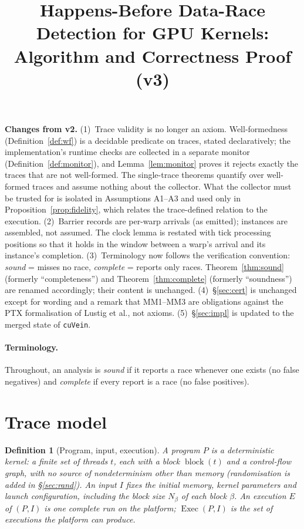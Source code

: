 \documentclass[11pt]{article}
\title{Happens-Before Data-Race Detection for GPU Kernels:\\
Algorithm and Correctness Proof (v3)}
\date{}
\newtheorem{definition}[theorem]{Definition}
\theoremstyle{remark}
\DeclareMathOperator{\blk}{block}
\DeclareMathOperator{\Exec}{Exec}
\begin{document}
\maketitle

\noindent\textbf{Changes from v2.}
(1)~Trace validity is no longer an axiom. Well-formedness
(Definition~\ref{def:wf}) is a decidable predicate on traces, stated
declaratively; the implementation's runtime checks are collected in a
separate monitor (Definition~\ref{def:monitor}), and Lemma~\ref{lem:monitor}
proves it rejects exactly the traces that are not well-formed. The single-trace theorems quantify over well-formed traces and assume
nothing about the collector. What the collector must be trusted for is
isolated in Assumptions A1--A3 and used only in
Proposition~\ref{prop:fidelity}, which relates the trace-defined relation to
the execution.
(2)~Barrier records are per-warp arrivals (as emitted); instances are
assembled, not assumed. The clock lemma is restated with tick processing
positions so that it holds in the window between a warp's arrival and its
instance's completion.
(3)~Terminology now follows the verification convention: \emph{sound} = misses
no race, \emph{complete} = reports only races. Theorem~\ref{thm:sound}
(formerly ``completeness'') and Theorem~\ref{thm:complete} (formerly
``soundness'') are renamed accordingly; their content is unchanged.
(4)~\S\ref{sec:cert} is unchanged except for wording and a remark that MM1--MM3
are obligations against the PTX formalisation of Lustig et al., not axioms.
(5)~\S\ref{sec:impl} is updated to the merged state of \texttt{cuVein}.

\paragraph{Terminology.}
Throughout, an analysis is \emph{sound} if it reports a race whenever one
exists (no false negatives) and \emph{complete} if every report is a race (no
false positives).

\section{Trace model}\label{sec:model}

\begin{definition}[Program, input, execution]
A \emph{program} $P$ is a deterministic kernel: a finite set of threads $t$,
each with a block $\blk(t)$ and a control-flow graph, with no source of
nondeterminism other than memory (randomisation is added in
\S\ref{sec:rand}). An \emph{input} $I$ fixes the initial memory, kernel
parameters and launch configuration, including the block size $N_\beta$ of
each block $\beta$. An \emph{execution} $E$ of $(P,I)$ is one complete run on
the platform; $\Exec(P,I)$ is the set of executions the platform can produce.
\end{definition}
\end{document}
